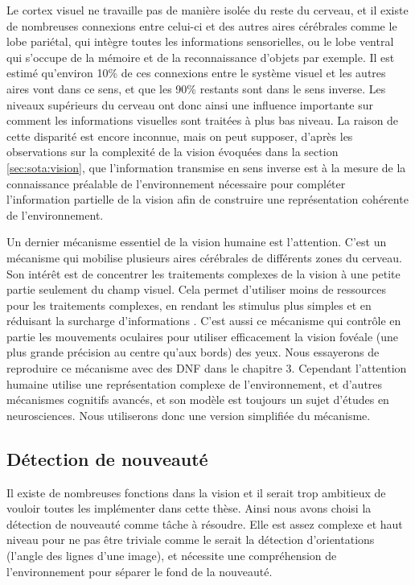 	Le cortex visuel ne travaille pas de manière isolée du reste du cerveau, et il existe de nombreuses connexions entre celui-ci et des autres aires cérébrales comme le lobe pariétal, qui intègre toutes les informations sensorielles, ou le lobe ventral qui s'occupe de la mémoire et de la reconnaissance d'objets par exemple. Il est estimé qu'environ 10\% de ces connexions entre le système visuel et les autres aires vont dans ce sens, et que les 90\% restants sont dans le sens inverse. Les niveaux supérieurs du cerveau ont donc ainsi une influence importante sur comment les informations visuelles sont traitées à plus bas niveau. La raison de cette disparité est encore inconnue, mais on peut supposer, d'après les observations sur la complexité de la vision évoquées dans la section \ref{sec:sota:vision}, que l'information transmise en sens inverse est à la mesure de la connaissance préalable de l'environnement nécessaire pour compléter l'information partielle de la vision afin de construire une représentation cohérente de l'environnement.

	Un dernier mécanisme essentiel de la vision humaine est l'attention. C'est un mécanisme qui mobilise plusieurs aires cérébrales de différents zones du cerveau. Son intérêt est de concentrer les traitements complexes de la vision à une petite partie seulement du champ visuel. Cela permet d'utiliser moins de ressources pour les traitements complexes, en rendant les stimulus plus simples et en réduisant la surcharge d'informations \cite{evans2011visual}. C'est aussi ce mécanisme qui contrôle en partie les mouvements oculaires pour utiliser efficacement la vision fovéale (une plus grande précision au centre qu'aux bords) des yeux. Nous essayerons de reproduire ce mécanisme avec des DNF dans le chapitre 3. Cependant l'attention humaine utilise une représentation complexe de l'environnement, et d'autres mécanismes cognitifs avancés, et son modèle est toujours un sujet d'études en neurosciences. Nous utiliserons donc une version simplifiée du mécanisme.

\subsection{Détection de nouveauté}\label{sec:sota:computer_vis}

	Il existe de nombreuses fonctions dans la vision et il serait trop ambitieux de vouloir toutes les implémenter dans cette thèse. Ainsi nous avons choisi la détection de nouveauté comme tâche à résoudre. Elle est assez complexe et haut niveau pour ne pas être triviale comme le serait la détection d'orientations (l'angle des lignes d'une image), et nécessite une compréhension de l'environnement pour séparer le fond de la nouveauté. 


